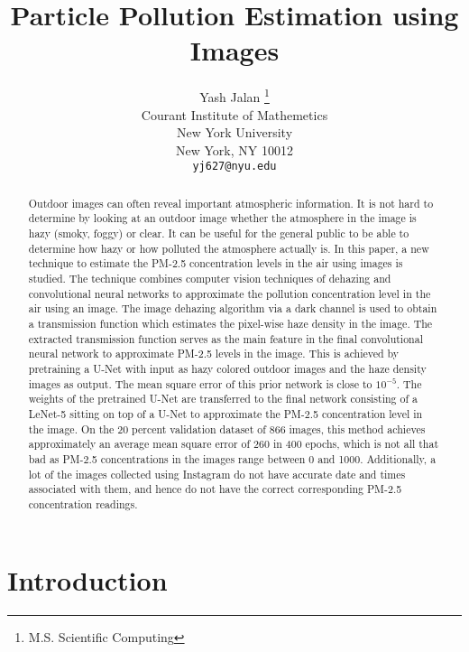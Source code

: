 \documentclass{article}
\title{Particle Pollution Estimation using Images}
\author{
  Yash Jalan \thanks{M.S. Scientific Computing} \\
  Courant Institute of Mathemetics\\
  New York University\\
  New York, NY 10012 \\
  \texttt{yj627@nyu.edu} \\
}
\begin{document}
\maketitle

\begin{abstract}
Outdoor images can often reveal important atmospheric information. It is not hard to determine by looking at an outdoor image whether the atmosphere in the image is hazy (smoky, foggy) or clear. It can be useful for the general public to be able to determine how hazy or how polluted the atmosphere actually is. In this paper, a new technique to estimate the PM-2.5 concentration levels in the air using images is studied. The technique combines computer vision techniques of dehazing and convolutional neural networks to approximate the pollution concentration level in the air using an image. The image dehazing algorithm via a dark channel is used to obtain a transmission function which estimates the pixel-wise haze density in the image. The extracted transmission function serves as the main feature in the final convolutional neural network to approximate PM-2.5 levels in the image. This is achieved by pretraining a U-Net with input as hazy colored outdoor images and the haze density images as output. The mean square error of this prior network is close to $10^{-5}$. The weights of the pretrained U-Net are transferred to the final network consisting of a LeNet-5 sitting on top of a U-Net to approximate the PM-2.5 concentration level in the image. On the 20 percent validation dataset of 866 images, this method achieves approximately an average mean square error of 260 in 400 epochs, which is not all that bad as PM-2.5 concentrations in the images range between 0 and 1000. Additionally, a lot of the images collected using Instagram do not have accurate date and times associated with them, and hence do not have the correct corresponding PM-2.5 concentration readings.
\end{abstract}


\section{Introduction}
\end{document}
